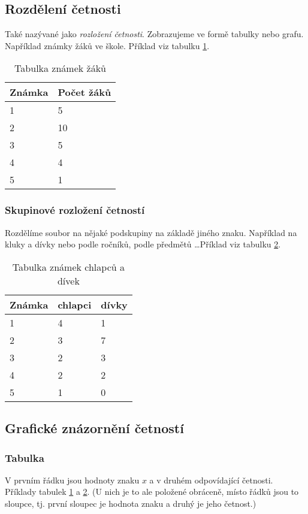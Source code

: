 \documentclass[12pt]{article}
\begin{document}
\subsection{Rozdělení četnosti}
Také nazývané jako \emph{rozložení četnosti}. Zobrazujeme ve formě tabulky nebo grafu.  Například známky žáků ve škole. Příklad viz tabulku \ref{table:zaci}.
\begin{table}[h!]
\begin{tabular}{|l|l|}
\hline
Známka & Počet žáků \\ \hline
1      & 5          \\ \hline
2      & 10         \\ \hline
3      & 5          \\ \hline
4      & 4          \\ \hline
5      & 1          \\ \hline
\end{tabular}
\caption{Tabulka známek žáků}
\label{table:zaci}
\end{table}
\subsubsection{Skupinové rozložení četností}
Rozdělíme soubor na nějaké podskupiny na základě jiného znaku. Například na kluky a dívky nebo podle ročníků, podle předmětů \dots Příklad viz tabulku \ref{table:zaci_pohlavi}.
\begin{table}[H]
\begin{tabular}{|l|l|l|}
\hline
Známka & chlapci & dívky \\ \hline
1      & 4       & 1     \\ \hline
2      & 3       & 7     \\ \hline
3      & 2       & 3     \\ \hline
4      & 2       & 2     \\ \hline
5      & 1       & 0     \\ \hline
\end{tabular}
\caption{Tabulka známek chlapců a dívek}
\label{table:zaci_pohlavi}
\end{table}
\subsection{Grafické znázornění četností}
\subsubsection{Tabulka}
V prvním řádku jsou hodnoty znaku $x$ a v druhém odpovídající četnosti. Příklady tabulek \ref{table:zaci} a \ref{table:zaci_pohlavi}. (U nich je to ale položené obráceně, místo řádků jsou to sloupce, tj. první sloupec je hodnota znaku a druhý je jeho četnost.)
\end{document}
